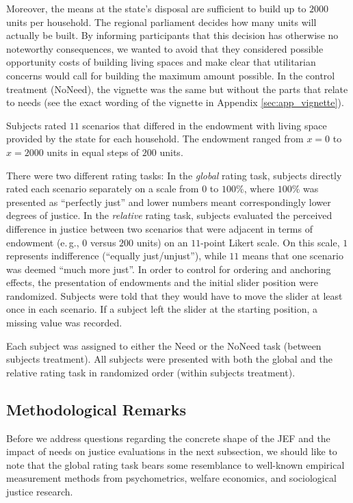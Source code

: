 \documentclass[12pt]{scrartcl}
\begin{document}
Moreover, the means at the state's disposal are sufficient to build up to $2000$ units per household.
The regional parliament decides how many units will actually be built.
By informing participants that this decision has otherwise no noteworthy consequences, we wanted to avoid that they considered possible opportunity costs of building living spaces and make clear that utilitarian concerns would call for building the maximum amount possible.
In the control treatment (NoNeed), the vignette was the same but without the parts that relate to needs (see the exact wording of the vignette in Appendix \ref{sec:app_vignette}).

Subjects rated $11$ scenarios that differed in the endowment with living space provided by the state for each household.
The endowment ranged from $x=0$ to $x=2000$ units in equal steps of $200$ units.

There were two different rating tasks: In the \textit{global} rating task, subjects directly rated each scenario separately on a scale from $0$ to $100\%$, where $100\%$ was presented as ``perfectly just'' and lower numbers meant correspondingly lower degrees of justice.
In the \textit{relative} rating task, subjects evaluated the perceived difference in justice between two scenarios that were adjacent in terms of endowment (e.\,g., $0$ versus $200$ units) on an $11$-point Likert scale.
On this scale, $1$ represents indifference (``equally just/unjust''), while $11$ means that one scenario was deemed ``much more just''.
In order to control for ordering and anchoring effects, the presentation of endowments and the initial slider position were randomized.
Subjects were told that they would have to move the slider at least once in each scenario.
If a subject left the slider at the starting position, a missing value was recorded.

Each subject was assigned to either the Need or the NoNeed task (between subjects treatment).
All subjects were presented with both the global and the relative rating task in randomized order (within subjects treatment).


\subsection{Methodological Remarks}\label{sec:remarks}
Before we address questions regarding the concrete shape of the JEF and the impact of needs on justice evaluations in the next subsection, we should like to note that the global rating task bears some resemblance to well-known empirical measurement methods from psychometrics, welfare economics, and sociological justice research.
\end{document}
